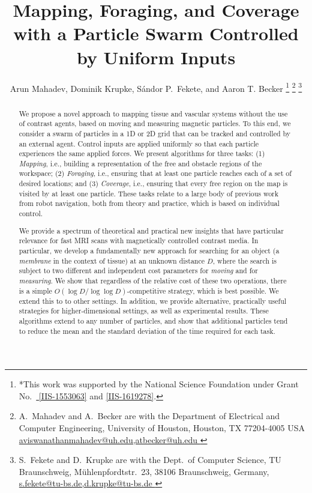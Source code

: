 \documentclass[letterpaper, 10 pt, conference]{ieeeconf}
\title{\LARGE \bf Mapping, Foraging, and Coverage\\ with a Particle Swarm Controlled by Uniform Inputs}
\author{Arun Mahadev, Dominik Krupke, S\'{a}ndor P.~Fekete, and Aaron T. Becker%
\thanks{*This work was supported by the National Science Foundation under Grant No.\ \href{http://nsf.gov/awardsearch/showAward?AWD_ID=1553063}{ [IIS-1553063]} and \href{http://nsf.gov/awardsearch/showAward?AWD_ID=1619278}{[IIS-1619278]}.}%
\thanks{A.~Mahadev and A.~Becker are with the Department of Electrical and Computer Engineering,  University of Houston, Houston, TX 77204-4005 USA 
      \protect\url{ aviswanathanmahadev@uh.edu,atbecker@uh.edu }}
\thanks{S.~Fekete and D.~Krupke are with the Dept.~of Computer Science, TU Braunschweig,  M\"uhlenpfordtstr.~23, 38106 Braunschweig, Germany,
      \protect\url{s.fekete@tu-bs.de,d.krupke@tu-bs.de  }
} %
}
\begin{document}
\maketitle
\thispagestyle{empty}
\pagestyle{empty}


\begin{abstract}
We propose a novel approach to mapping tissue and vascular systems without the use of contrast agents,
based on moving and measuring magnetic particles.
To this end, we consider a swarm of particles in a 1D or 2D grid that can be tracked and controlled by an external agent. 
Control inputs are applied uniformly so that each particle experiences the same applied forces. 
We present algorithms for three tasks: (1) {\em Mapping}, i.e., building a representation of the free and obstacle regions of the workspace;
(2) {\em Foraging}, i.e., ensuring that at least one particle reaches each of a set of desired locations; 
and (3) {\em Coverage}, i.e., ensuring that every free region on the map is visited by at least one particle.
These tasks relate to a large body of previous work from robot navigation, both from theory and practice, 
which is based on individual control.

We provide a spectrum of theoretical and practical new insights 
that have particular relevance for fast MRI scans with magnetically controlled contrast media.
In particular, we develop a fundamentally new approach 
for searching for an object (a {\em membrane} in the context of tissue) at an unknown distance $D$, where the search is 
subject to two different and independent cost parameters
for {\em moving} and for {\em measuring}. We show that regardless of the relative cost of these two operations,
there is a simple $O(\log D/\log\log D)$-competitive strategy, which is best possible.
We extend this to to other settings. In addition, we provide alternative, practically useful strategies for higher-dimensional
settings, as well as experimental results.
These algorithms extend to any number of particles, and show that additional
particles tend to reduce the mean and the standard deviation of the time required for each task.  %


\end{abstract}
\end{document}
